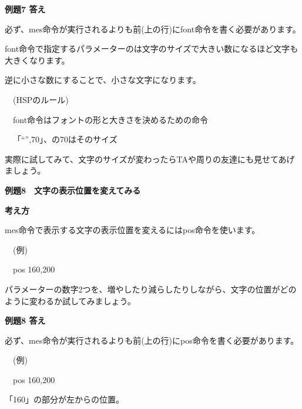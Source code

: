 \documentclass[a4paper,dvipdfmx]{jarticle}
\newcommand\textstyleqwerty[1]{#1}
\begin{document}
\bigskip

{\bfseries
例題7 答え}


\bigskip

必ず、mes命令が実行されるよりも前(上の行)にfont命令を書く必要があります。

font命令で指定するパラメーターのは文字のサイズで大きい数になるほど文字も大きくなります。

逆に小さな数にすることで、小さな文字になります。


\bigskip

\ \ (HSPのルール)


\bigskip

\ \ font命令はフォントの形と大きさを決めるための命令

\ \ 「“”,70」、の70はそのサイズ


\bigskip

実際に試してみて、文字のサイズが変わったらTAや周りの友達にも見せてあげましょう。


\bigskip


\bigskip


\bigskip


\bigskip


\bigskip

\textstyleqwerty{\textbf{例題8　文字の表示位置を変えてみる}}


\bigskip

{\bfseries
考え方}


\bigskip

mes命令で表示する文字の表示位置を変えるにはpos命令を使います。


\bigskip

\ \ (例)

\ \ pos 160,200


\bigskip

パラメーターの数字2つを、増やしたり減らしたりしながら、文字の位置がどのように変わるか試してみましょう。


\bigskip


\bigskip


\bigskip

{\bfseries
例題8 答え}


\bigskip

必ず、mes命令が実行されるよりも前(上の行)にpos命令を書く必要があります。


\bigskip

\ \ (例)

\ \ pos 160,200


\bigskip

「160」の部分が左からの位置。
\end{document}
